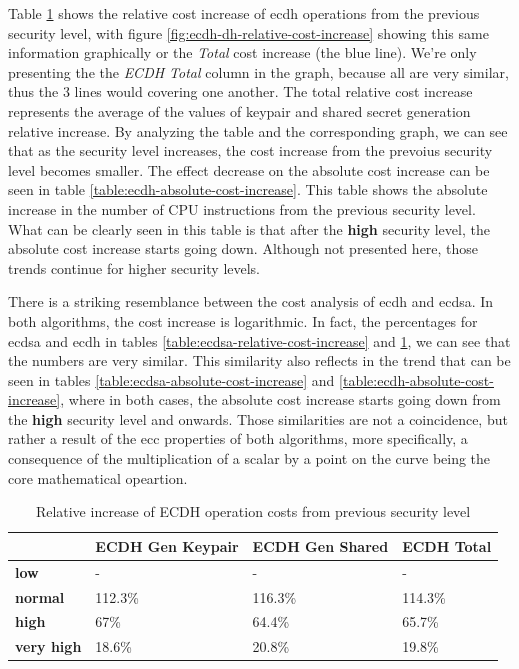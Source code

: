 \documentclass{llncs}
\begin{document}
Table \ref{table:ecdh-relative-cost-increase} shows the relative cost increase of \gls{ecdh} operations from the previous security
level, with figure \ref{fig:ecdh-dh-relative-cost-increase} showing this same information graphically or the \textit{Total} cost increase (the blue line). 
We're only presenting the the \textit{ECDH Total} column in the graph, because all are very similar, thus the $3$ lines would covering one another.
The total relative cost increase represents the average of the values of keypair and shared secret generation relative increase. 
By analyzing the table and the corresponding graph, we can see  that as the security level increases, the cost increase  from the prevoius security 
level becomes smaller. The effect decrease on the absolute cost increase can be seen in table \ref{table:ecdh-absolute-cost-increase}. 
This table shows the absolute increase in the number of CPU instructions from 
the previous security level. What can be clearly seen in this table is that after the \textbf{high} security level, the absolute cost increase starts 
going down. Although not presented here, those trends continue for higher security levels.

There is a striking resemblance between the cost analysis of \gls{ecdh} and \gls{ecdsa}. In both algorithms, the cost increase is logarithmic. 
In fact, the percentages for \gls{ecdsa} and \gls{ecdh} in tables \ref{table:ecdsa-relative-cost-increase}
and \ref{table:ecdh-relative-cost-increase}, we can see that the numbers are very similar. This similarity also reflects in the
trend that can be seen in tables \ref{table:ecdsa-absolute-cost-increase} and \ref{table:ecdh-absolute-cost-increase}, where in both cases, the
absolute cost increase starts going down from the \textbf{high} security level and onwards. Those similarities are not a coincidence, but rather
a result of the \gls{ecc} properties of both algorithms, more specifically, a consequence of the multiplication of a scalar by a point on
the curve being the core mathematical opeartion.

\begin{table}[]
  \begin{tabular}{|l|l|l|l|}
  \hline
                     & \textbf{ECDH Gen Keypair} & \textbf{ECDH Gen Shared} & \textbf{ECDH Total}  \\ \hline
  \textbf{low}       & -                         & -                        & -                    \\ \hline
  \textbf{normal}    & 112.3\%                   & 116.3\%                  & 114.3\%              \\ \hline
  \textbf{high}      & 67\%                      & 64.4\%                   & 65.7\%               \\ \hline
  \textbf{very high} & 18.6\%                    & 20.8\%                   & 19.8\%               \\ \hline
  \end{tabular}
  \centering \caption{\label{table:ecdh-relative-cost-increase} Relative increase of ECDH operation costs from previous security level}
  \end{table}
\end{document}

